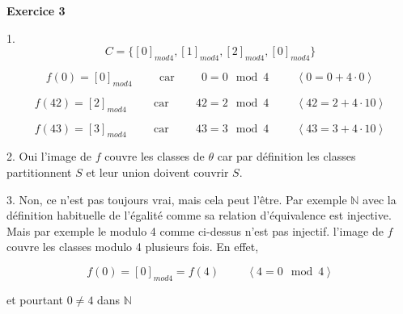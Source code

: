 \documentclass{article}
\newcommand{\tuple}[1]{\ensuremath{\left\langle #1 \right\rangle}}
\begin{document}
\textbf{Exercice 3}

\vspace{0.5cm}
1.
$$ C = \{ [0]_{mod{4}},[1]_{mod{4}}, [2]_{mod{4}},[0]_{mod{4}} \}$$

$$f(0) = [0]_{mod{4}} \hspace{1cm} \text{car} \hspace{1cm} 0 = 0 \mod{4} \hspace{1cm} \tuple{ 0 = 0 + 4\cdot0 }$$

$$f(42) = [2]_{mod{4}} \hspace{1cm} \text{car} \hspace{1cm} 42 = 2 \mod{4} \hspace{1cm} \tuple{ 42 = 2 + 4\cdot10 }$$

$$f(43) = [3]_{mod{4}} \hspace{1cm} \text{car} \hspace{1cm} 43 = 3 \mod{4} \hspace{1cm} \tuple{ 43 = 3 + 4\cdot10 }$$

2. Oui l'image de $f$ couvre les classes de $\theta$ car par définition les classes partitionnent $S$ et leur union doivent couvrir $S$.

3. Non, ce n'est pas toujours vrai, mais cela peut l'être. Par exemple $\mathbb{N}$ avec la définition habituelle de l'égalité comme sa relation d'équivalence est injective. Mais par exemple le modulo 4 comme ci-dessus n'est pas injectif. l'image de $f$ couvre les classes modulo 4 plusieurs fois. En effet,

$$ f(0) = [0]_{mod{4}} = f(4) \hspace{1cm} \tuple{ 4 = 0 \mod{4} } $$

et pourtant $ 0 \neq 4 $ dans $\mathbb{N}$
\end{document}
